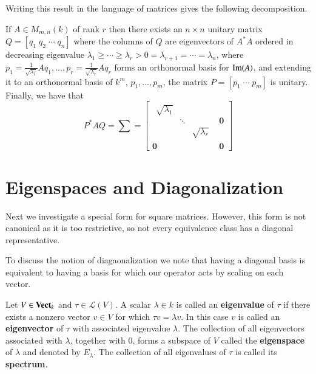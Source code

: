 Writing this result in the language of matrices gives the following decomposition.

\begin{corollary}
    If $A \in M_{m,n}(k)$ of rank $r$ then there exists an $n\times n$ unitary matrix $Q = [q_1\;q_2\;\cdots \;q_n]$ where the columns of $Q$ are eigenvectors of $A^*A$ ordered in decreasing eigenvalue $\lambda_1 \geq \cdots \geq \lambda_r > 0 = \lambda_{r+1}=\cdots = \lambda_n$, where $p_1 = \frac{1}{\sqrt{\lambda_1}}Aq_1,...,p_r = \frac{1}{\sqrt{\lambda_r}}Aq_r$ forms an orthonormal basis for $\operatorname{Im}(A)$, and extending it to an orthonormal basis of $k^m$, $p_1,...,p_m$, the matrix $P = [p_1\;\cdots \;p_m]$ is unitary. Finally, we have that \begin{equation*}
        P^*AQ = \sum = \left[\begin{array}{c|c} \begin{array}{ccc} \sqrt{\lambda_1} &  &  \\  & \ddots &  \\  &  & \sqrt{\lambda_r} \end{array} & \mathbf{0} \\ \hline \mathbf{0} & \mathbf{0} \end{array}\right]
    \end{equation*}
\end{corollary}


\section{Eigenspaces and Diagonalization}\label{sec:Eigen}

Next we investigate a special form for square matrices. However, this form is not canonical as it is too restrictive, so not every equivalence class has a diagonal representative. 

To discuss the notion of diagaonalization we note that having a diagonal basis is equivalent to having a basis for which our operator acts by scaling on each vector.

\begin{definition}
    Let $V \in \normalfont\textbf{Vect}_{k}$ and $\tau \in \mathcal{L}(V)$. A scalar $\lambda \in k$ is called an \textbf{eigenvalue} of $\tau$ if there exists a nonzero vector $v \in V$ for which $\tau v = \lambda v$. In this case $v$ is called an \textbf{eigenvector} of $\tau$ with associated eigenvalue $\lambda$. The collection of all eigenvectors associated with $\lambda$, together with $0$, forms a subspace of $V$ called the \textbf{eigenspace} of $\lambda$ and denoted by $E_{\lambda}$. The collection of all eigenvalues of $\tau$ is called its \textbf{spectrum}.
\end{definition}

